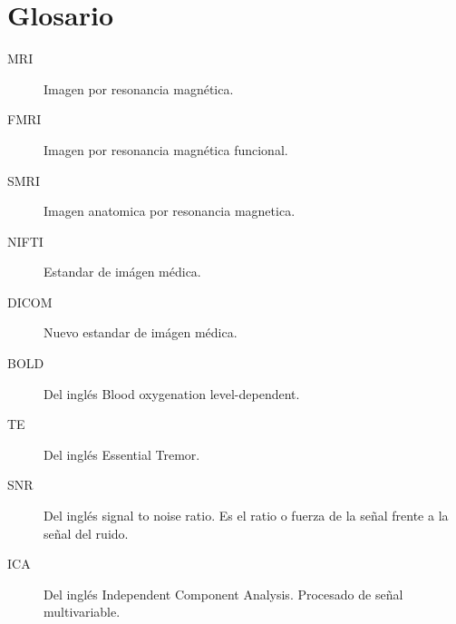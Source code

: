 
\chapter{Glosario}
\begin{description}
\item[MRI] Imagen por resonancia magnética. \label{glos:mri}
\item[FMRI] Imagen por resonancia magnética funcional. \label{glos:fmri}
\item[SMRI] Imagen anatomica por resonancia magnetica. \label{glos:smri}
\item[NIFTI] Estandar de imágen médica. \label{glos:nifti}
\item[DICOM] Nuevo estandar de imágen médica. \label{glos:dicom}
\item[BOLD] Del inglés Blood oxygenation level-dependent. \label{glos:bold}
\item[TE] Del inglés Essential Tremor. \label{glos:et}
\item[SNR] Del inglés signal to noise ratio. Es el ratio o fuerza de la señal frente a la señal del ruido. \label{glos:snr}
\item[ICA] Del inglés Independent Component Analysis. Procesado de señal multivariable. \label{glos:ica}
\end{description}